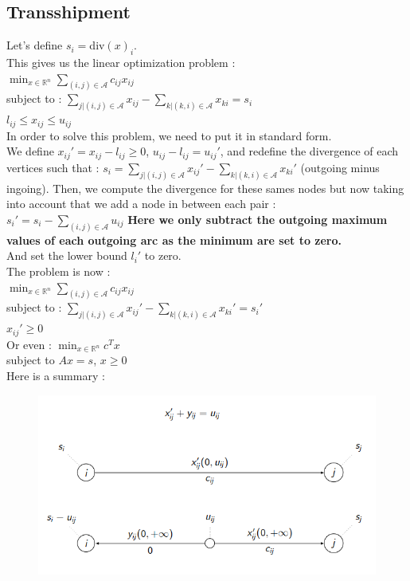 \documentclass[../main.tex]{subfiles}
\begin{document}
\subsection{Transshipment}
Let's define $s_i = $div$(x)_i$.\\

This gives us the linear optimization problem : \\
$\min_{x\in \mathbb{R}^n} \sum_{(i,j)\in \mathcal{A}} c_{ij} x_{ij}$\\
subject to : $\sum_{j\lvert (i,j) \in \mathcal{A}} x_{ij} - \sum_{k\lvert (k,i) \in \mathcal{A}} x_{ki} = s_i$\\
$l_{ij} \leq x_{ij} \leq u_{ij}$\\

In order to solve this problem, we need to put it in standard form.\\
We define $x_{ij}' = x_{ij}-l_{ij} \geq 0$, $u_{ij}-l_{ij} = u_{ij}'$, and redefine the divergence of each vertices such that : $s_i = \sum_{j\lvert (i,j) \in \mathcal{A}} x_{ij}' -\sum_{k\lvert (k,i) \in \mathcal{A}} x_{ki}'$ (outgoing minus ingoing). Then, we compute the divergence for these sames nodes but now taking into account that we add a node in between each pair : \\
$s_{i}' = s_i - \sum_{(i,j)\in\mathcal{A}}u_{ij}$ \textbf{\warning Here we only subtract the outgoing maximum values of each outgoing arc as the minimum are set to zero.}\\

And set the lower bound $l_i'$ to zero.\\

The problem is now : \\

$\min_{x\in \mathbb{R}^n} \sum_{(i,j)\in \mathcal{A}} c_{ij}x_{ij}$\\
subject to : $\sum_{j\lvert (i,j) \in \mathcal{A}} x_{ij}' -\sum_{k\lvert (k,i) \in \mathcal{A}} x_{ki}' = s_i'$\\
$x_{ij}'\geq 0$\\

Or even : $\min_{x\in \mathbb{R}^n} c^Tx$\\
subject to $Ax=s$, $x\geq 0$\\
Here is a summary : 

\begin{figure}[hbt!]
    \centering
    \includegraphics[width=.6\textwidth]{IMAGES/opti/Screenshot from 2024-01-13 21-55-37.png}
\end{figure}
\end{document}
